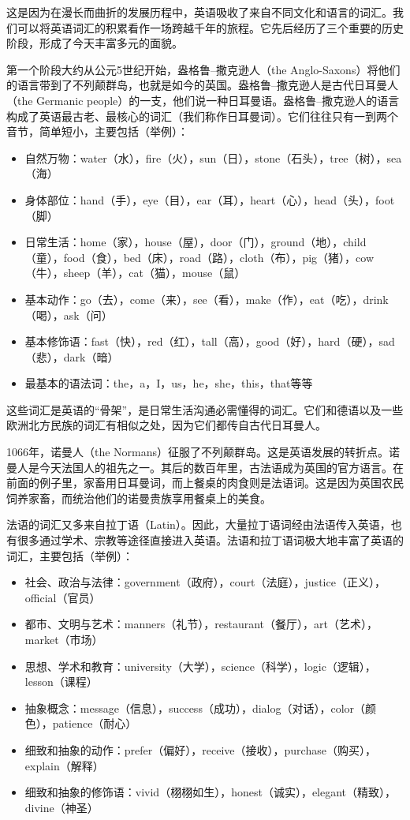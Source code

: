 \documentclass[10.5pt, a4paper]{ctexbook} %
\begin{document}
这是因为在漫长而曲折的发展历程中，英语吸收了来自不同文化和语言的词汇。我们可以将英语词汇的积累看作一场跨越千年的旅程。它先后经历了三个重要的历史阶段，形成了今天丰富多元的面貌。

第一个阶段大约从公元5世纪开始，盎格鲁–撒克逊人（the Anglo-Saxons）将他们的语言带到了不列颠群岛，也就是如今的英国。盎格鲁–撒克逊人是古代日耳曼人（the Germanic people）的一支，他们说一种日耳曼语。盎格鲁–撒克逊人的语言构成了英语最古老、最核心的词汇（我们称作日耳曼词）。它们往往只有一到两个音节，简单短小，主要包括（举例）：
\begin{itemize}
    \item 自然万物：water（水），fire（火），sun（日），stone（石头），tree（树），sea（海）
    \item 身体部位：hand（手），eye（目），ear（耳），heart（心），head（头），foot（脚）
    \item 日常生活：home（家），house（屋），door（门），ground（地），child（童），food（食），bed（床），road（路），cloth（布），pig（猪），cow（牛），sheep（羊），cat（猫），mouse（鼠）
    \item 基本动作：go（去），come（来），see（看），make（作），eat（吃），drink（喝），ask（问）
    \item 基本修饰语：fast（快），red（红），tall（高），good（好），hard（硬），sad（悲），dark（暗）
    \item 最基本的语法词：the，a，I，us，he，she，this，that等等
\end{itemize}

这些词汇是英语的“骨架”，是日常生活沟通必需懂得的词汇。它们和德语以及一些欧洲北方民族的词汇有相似之处，因为它们都传自古代日耳曼人。

1066年，诺曼人（the Normans）征服了不列颠群岛。这是英语发展的转折点。诺曼人是今天法国人的祖先之一。其后的数百年里，古法语成为英国的官方语言。在前面的例子里，家畜用日耳曼词，而上餐桌的肉食则是法语词。这是因为英国农民饲养家畜，而统治他们的诺曼贵族享用餐桌上的美食。

法语的词汇又多来自拉丁语（Latin）。因此，大量拉丁语词经由法语传入英语，也有很多通过学术、宗教等途径直接进入英语。法语和拉丁语词极大地丰富了英语的词汇，主要包括（举例）：
\begin{itemize}
    \item 社会、政治与法律：government（政府），court（法庭），justice（正义），official（官员）
    \item 都市、文明与艺术：manners（礼节），restaurant（餐厅），art（艺术），market（市场）
    \item 思想、学术和教育：university（大学），science（科学），logic（逻辑），lesson（课程）
    \item 抽象概念：message（信息），success（成功），dialog（对话），color（颜色），patience（耐心）
    \item 细致和抽象的动作：prefer（偏好），receive（接收），purchase（购买），explain（解释）
    \item 细致和抽象的修饰语：vivid（栩栩如生），honest（诚实），elegant（精致），divine（神圣）
\end{itemize}
\end{document}
